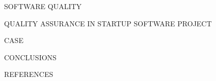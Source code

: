 \documentclass[12pt,a4paper,finnish]{tillbehor/tutthesis}
\begin{document}


 

 
 SOFTWARE QUALITY
 
 

	QUALITY ASSURANCE IN STARTUP SOFTWARE PROJECT
 

 
	CASE



	CONCLUSIONS



	REFERENCES


 
\end{document}
